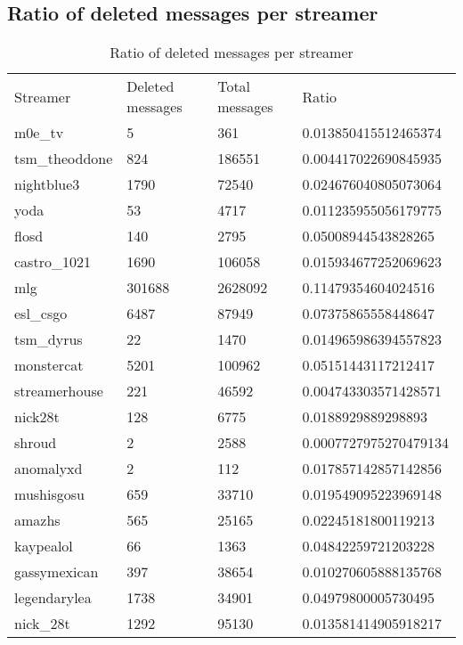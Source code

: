 \documentclass[final]{report} %
\begin{document}
\begin{appendices}
\section{Ratio of deleted messages per streamer}
\begin{table}[h]
\centering
\caption{Ratio of deleted messages per streamer}
\label{ratio_table}
\renewcommand{\arraystretch}{0.9}%
\begin{tabular}{llll}
Streamer 		 & Deleted messages & Total messages & Ratio \\
m0e\_tv          & 5      & 361     & 0.013850415512465374  \\
tsm\_theoddone   & 824    & 186551  & 0.004417022690845935  \\
nightblue3       & 1790   & 72540   & 0.024676040805073064  \\
yoda             & 53     & 4717    & 0.011235955056179775  \\
flosd            & 140    & 2795    & 0.05008944543828265   \\
castro\_1021     & 1690   & 106058  & 0.015934677252069623  \\
mlg              & 301688 & 2628092 & 0.11479354604024516   \\
esl\_csgo        & 6487   & 87949   & 0.07375865558448647   \\
tsm\_dyrus       & 22     & 1470    & 0.014965986394557823  \\
monstercat       & 5201   & 100962  & 0.05151443117212417   \\
streamerhouse    & 221    & 46592   & 0.004743303571428571  \\
nick28t          & 128    & 6775    & 0.0188929889298893    \\
shroud           & 2      & 2588    & 0.0007727975270479134 \\
anomalyxd        & 2      & 112     & 0.017857142857142856  \\
mushisgosu       & 659    & 33710   & 0.019549095223969148  \\
amazhs           & 565    & 25165   & 0.02245181800119213   \\
kaypealol        & 66     & 1363    & 0.04842259721203228   \\
gassymexican     & 397    & 38654   & 0.010270605888135768  \\
legendarylea     & 1738   & 34901   & 0.04979800005730495   \\
nick\_28t        & 1292   & 95130   & 0.013581414905918217  \\

\end{tabular}
\end{table}
\end{appendices}
\end{document}
